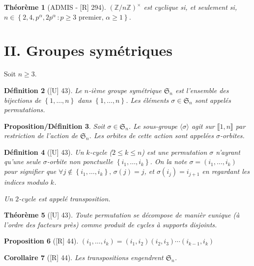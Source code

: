 \documentclass[10pt, a4paper, parskip=full, twoside, twocolumn]{report}
\newtheorem{definition}{Définition}
\newtheorem{theorem}[definition]{Théorème}
\newtheorem{proposition}[definition]{Proposition}
\newtheorem{proposition_def}[definition]{Proposition/Définition}
\newtheorem{corollary}[definition]{Corollaire}
\newcommand{\IZnZ}{\mathbb{Z}/n\mathbb{Z}}
\begin{document}
\begin{theorem}[ADMIS - \textnormal{[R] 294}]
	$\left(\IZnZ\right)^{\times}$ est cyclique si, et seulement si, $n\in\left\{2,4,p^{\alpha},2p^{\alpha}\,\colon p\geq 3\text{ premier},\,\alpha\geq 1\right\}$.
\end{theorem}

\section*{II. Groupes symétriques}
\textcolor{paragraphtext}{Soit $n\geq 3$.}

\begin{definition}[\textnormal{[U] 43}]
	Le \emph{$n$-ième groupe symétrique $\mathfrak{S}_n$} est l'ensemble des bijections de $\left\{1,\dots, n\right\}$ dans $\left\{1,\dots, n\right\}$.
	Les éléments $\sigma\in\mathfrak{S}_n$ sont appelés \emph{permutations}.
\end{definition}

\begin{proposition_def}
	Soit $\sigma\in\mathfrak{S}_n$. Le sous-groupe $\langle \sigma\rangle$ agit sur $\llbracket 1,n\rrbracket$ par restriction de l'action de $\mathfrak{S}_n$.
	Les orbites de cette action sont appelées $\sigma$-orbites.
\end{proposition_def}

\begin{definition}[\textnormal{[U] 43}]
	Un $k$-cycle ($2\leq k\leq n$) est une permutation $\sigma$ n'ayrant qu'une seule $\sigma$-orbite non ponctuelle $\left\{i_1,\dots, i_k\right\}$.
	On la note $\sigma = (i_1,\dots, i_k)$ pour signifier que $\forall j\notin\left\{i_1,\dots, i_k\right\},\,\sigma(j)=j$, et $\sigma(i_j) = i_{j+1}$ en regardant les indices modulo $k$.

	Un $2$-cycle est appelé \emph{transposition}.
\end{definition}

\begin{theorem}[\textnormal{[U] 43}]
	Toute permutation se décompose de manièr eunique (à l'ordre des facteurs près) comme produit de cycles à supports disjoints.
\end{theorem}

\begin{proposition}[\textnormal{[R] 44}]
	$(i_1,\dots,i_k) = (i_1,i_2)(i_2,i_3)\cdots (i_{k-1},i_k)$
\end{proposition}

\begin{corollary}[\textnormal{[R] 44}]
	Les transpositions engendrent $\mathfrak{S}_n$.
\end{corollary}
\end{document}
